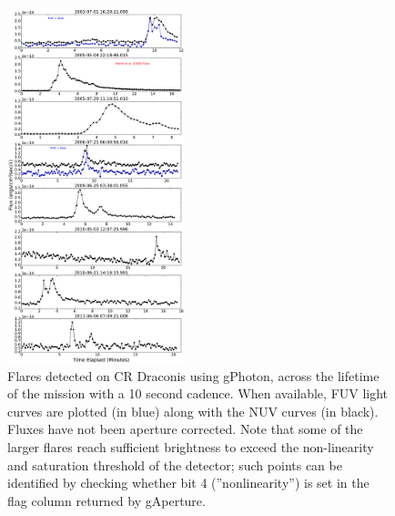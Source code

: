 \documentclass[trackchanges,preprint2]{aastex}
\begin{document}
\begin{figure}[h!]
\includegraphics[width=0.46\textwidth,keepaspectratio]{Fig13.pdf}
\caption{Flares detected on CR Draconis using gPhoton, across the lifetime of the mission with a 10 second cadence. When available, FUV light curves are plotted (in blue) along with the NUV curves (in black). Fluxes have not been aperture corrected. Note that some of the larger flares reach sufficient brightness to exceed the non-linearity and saturation threshold of the detector; such points can be identified by checking whether bit 4 (''nonlinearity'') is set in the flag column returned by gAperture.
\label{crdraflares}}
\end{figure}
\end{document}

